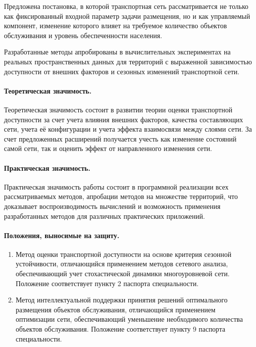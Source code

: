 Предложена постановка, в которой транспортная сеть рассматривается не только как фиксированный входной параметр задачи размещения, но и как управляемый компонент, изменение которого влияет на требуемое количество объектов обслуживания и уровень обеспеченности населения.

Разработанные методы апробированы в вычислительных экспериментах на реальных пространственных данных для территорий с выраженной зависимостью доступности от внешних факторов и сезонных изменений транспортной сети.


\paragraph*{Теоретическая значимость.}

Теоретическая значимость состоит в развитии теории оценки транспортной доступности за счет учета влияния внешних факторов, качества составляющих сети, учета её конфигурации и учета эффекта взаимосвязи между слоями сети. За счет предложенных расширений получается учесть как изменение состояний самой сети, так и оценить эффект от направленного изменения сети.

\paragraph*{Практическая значимость.}
Практическая значимость работы состоит в программной реализации всех рассматриваемых методов, апробации методов на множестве территорий, что доказывает воспроизводимость вычислений и возможность применения разработанных методов для различных практических приложений.

\paragraph*{Положения, выносимые на защиту.}
\begin{enumerate}
    \item Метод оценки транспортной доступности на основе критерия сезонной устойчивости, отличающийся применением методов сетевого анализа, обеспечивающий учет стохастической динамики многоуровневой сети. Положение соответствует пункту 2 паспорта специальности.

    \item Метод интеллектуальной поддержки принятия решений оптимального размещения объектов обслуживания, отличающийся применением оптимизации сети, обеспечивающий уменьшение необходимого количества объектов обслуживания. Положение соответствует пункту 9 паспорта специальности.
\end{enumerate}

